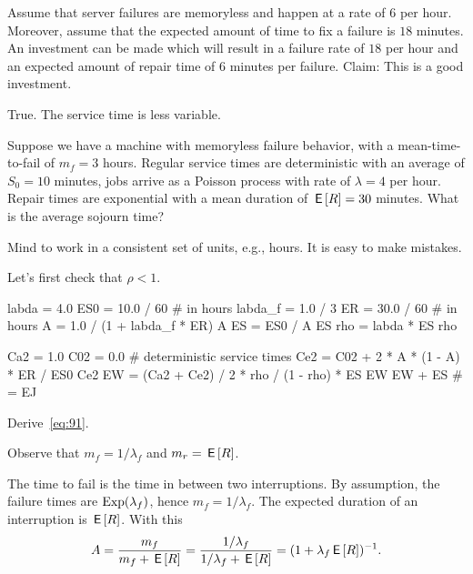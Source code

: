 \documentclass[stochastic-or.tex]{subfiles}
\begin{document}
\begin{truefalse}
Assume that server failures are memoryless and happen at a rate of $6$ per hour. Moreover, assume that the expected amount of time to fix a failure is $18$ minutes. An investment can be made which will result in a failure rate of $18$ per hour and an expected amount of repair time of $6$ minutes per failure.
Claim: This is a good investment.
    \begin{solution}
        True. The service time is less variable.
    \end{solution}
\end{truefalse}



\begin{exercise}\label{ex:l-157}
Suppose we have a machine with memoryless failure behavior, with a mean-time-to-fail of $m_{f}=3$ hours.
Regular service times are deterministic with an average of $S_{0}=10$ minutes, jobs arrive as a Poisson process with rate of $\lambda=4$ per hour.
Repair times are exponential with a mean duration of $\,\mathsf{E}\left[R\right] = 30$ minutes.
What is the average sojourn time?
\begin{hint}
 Mind to work in a consistent set of units, e.g., hours. It is easy to make mistakes.
\end{hint}
\begin{solution}
  Let's first check that $\rho< 1$.
\begin{pyconsole}
labda = 4.0
ES0 = 10.0 / 60  # in hours
labda_f = 1.0 / 3
ER = 30.0 / 60  # in hours
A = 1.0 / (1 + labda_f * ER)
A
ES = ES0 / A
ES
rho = labda * ES
rho
\end{pyconsole}
\begin{pyconsole}
Ca2 = 1.0
C02 = 0.0  # deterministic service times
Ce2 = C02 + 2 * A * (1 - A) * ER / ES0
Ce2
EW = (Ca2 + Ce2) / 2 * rho / (1 - rho) * ES
EW
EW + ES  # = EJ
\end{pyconsole}
\end{solution}
\end{exercise}

\begin{exercise}\label{ex:80}
 Derive~\cref{eq:91}.
\begin{hint}
 Observe that $m_f = 1/\lambda_f$ and $m_r = \,\mathsf{E}\left[R\right]$.
\end{hint}
\begin{solution}
  The time to fail is the time in between two interruptions.
  By assumption, the failure times are $\mathrm{Exp}(\lambda_f)$, hence $m_f = 1/\lambda_f$.
  The expected duration of an interruption is $\,\mathsf{E}\left[R\right]$.   With this
\begin{equation*}
 A=\frac{m_f}{m_f + \,\mathsf{E}\left[R\right]}=\frac{1/\lambda_f }{1/\lambda_f + \,\mathsf{E}\left[R\right]} = (1+\lambda_{f} \,\mathsf{E}\left[R\right])^{-1}.
\end{equation*}
\end{solution}
\end{exercise}
\end{document}
